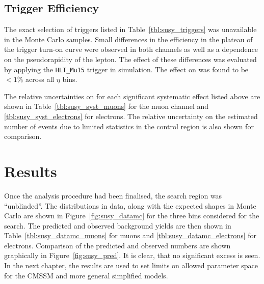 \subsection{Trigger Efficiency}
The exact selection of triggers listed in Table~\ref{tbl:susy_triggers} was
unavailable in the Monte Carlo samples. Small differences in the efficiency in
the plateau of the trigger turn-on curve were observed in both channels as well
as a dependence on the pseudorapidity of the lepton. The effect of these
differences was evaluated by applying the \texttt{HLT\_Mu15} trigger in
simulation. The effect on \RCS was found to be $<1\%$ across all $\eta$ bins.


The relative uncertainties on \RCS for each significant systematic effect listed
above are shown in Table~\ref{tbl:susy_syst_muons} for the muon channel and
\ref{tbl:susy_syst_electrons} for electrons. The relative uncertainty on the
estimated number of events due to limited statistics in the control region is
also shown for comparison.




\section{Results}
Once the analysis procedure had been finalised, the search region was
``unblinded''. The \LP distributions in data, along with the expected shapes in
Monte Carlo are shown in Figure~\ref{fig:susy_datamc} for the three \STlep bins
considered for the search. The predicted and observed background yields are then
shown in Table~\ref{tbl:susy_datamc_muons} for muons and
\ref{tbl:susy_datamc_electrons} for electrons. Comparison of the predicted and
observed numbers are shown graphically in Figure~\ref{fig:susy_pred}. It is
clear, that no significant excess is seen. In the next chapter, the results are
used to set limits on allowed parameter space for the \ac{CMSSM} and more
general simplified models.

